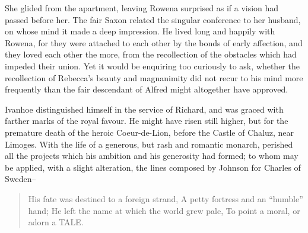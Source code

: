 She glided from the apartment, leaving Rowena surprised as if a vision
had passed before her. The fair Saxon related the singular conference to
her husband, on whose mind it made a deep impression. He lived long and
happily with Rowena, for they were attached to each other by the bonds
of early affection, and they loved each other the more, from the
recollection of the obstacles which had impeded their union. Yet it
would be enquiring too curiously to ask, whether the recollection of
Rebecca's beauty and magnanimity did not recur to his mind more
frequently than the fair descendant of Alfred might altogether have
approved.

Ivanhoe distinguished himself in the service of Richard, and was graced
with farther marks of the royal favour. He might have risen still
higher, but for the premature death of the heroic Coeur-de-Lion, before
the Castle of Chaluz, near Limoges. With the life of a generous, but
rash and romantic monarch, perished all the projects which his ambition
and his generosity had formed; to whom may be applied, with a slight
alteration, the lines composed by Johnson for Charles of Sweden--

\begin{quote}
His fate was destined to a foreign strand,
A petty fortress and an ``humble'' hand;
He left the name at which the world grew pale,
To point a moral, or adorn a TALE.
\end{quote}
